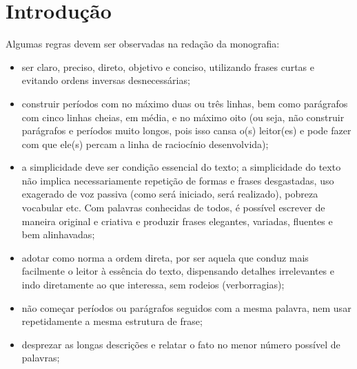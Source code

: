 \chapter{Introdução}



Algumas regras devem ser observadas na redação da monografia:

	\begin{itemize}
		\item ser claro, preciso, direto, objetivo e conciso, utilizando frases curtas e evitando ordens inversas desnecessárias;
		
		\item construir períodos com no máximo duas ou três linhas, bem como parágrafos com cinco linhas cheias, em média, e no máximo oito (ou seja, não construir parágrafos e períodos muito longos, pois isso cansa o(s) leitor(es) e pode fazer com que ele(s) percam a linha de raciocínio desenvolvida);
		
		\item a simplicidade deve ser condição essencial do texto; a simplicidade do texto não implica necessariamente repetição de formas e frases desgastadas, uso exagerado de voz passiva (como será iniciado, será realizado), pobreza vocabular etc. Com palavras conhecidas de todos, é possível escrever de maneira original e criativa e produzir frases elegantes, variadas, fluentes e bem alinhavadas;
		
		\item adotar como norma a ordem direta, por ser aquela que conduz mais facilmente o leitor à essência do texto, dispensando detalhes irrelevantes e indo diretamente ao que interessa, sem rodeios (verborragias);

		\item não começar períodos ou parágrafos seguidos com a mesma palavra, nem usar repetidamente a mesma estrutura de frase;

		\item desprezar as longas descrições e relatar o fato no menor número possível de palavras;
		

\end{itemize}

